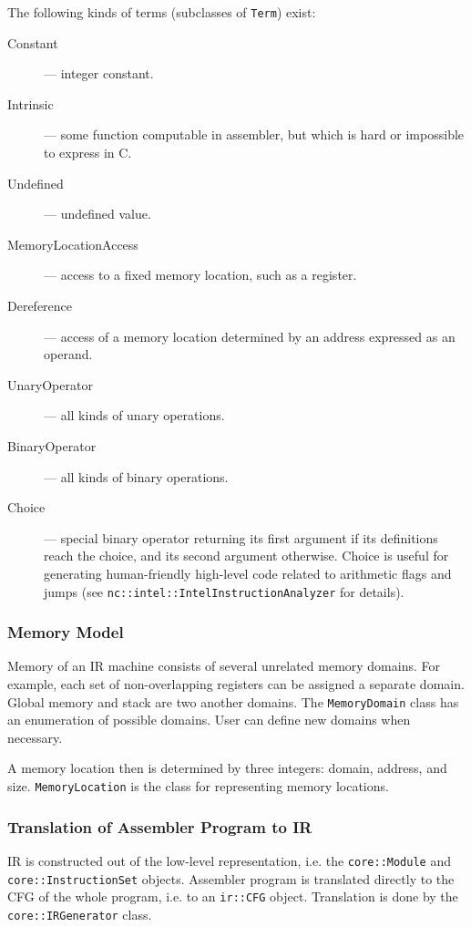 \documentclass[a4paper,12pt]{article}
\newcommand{\ident}[1]{\texttt{#1}}
\begin{document}
The following kinds of terms (subclasses of \ident{Term}) exist:
\begin{description}
\item[Constant] --- integer constant.
\item[Intrinsic] --- some function computable in assembler, but which is hard or impossible to express in C.
\item[Undefined] --- undefined value.
\item[MemoryLocationAccess] --- access to a fixed memory location, such as a register.
\item[Dereference] --- access of a memory location determined by an address expressed as an operand.
\item[UnaryOperator] --- all kinds of unary operations.
\item[BinaryOperator] --- all kinds of binary operations.
\item[Choice] --- special binary operator returning its first argument if its definitions reach the choice, and its second argument otherwise.
Choice is useful for generating human-friendly high-level code related to arithmetic flags and jumps (see \ident{nc::intel::IntelInstructionAnalyzer} for details).
\end{description}

\subsubsection{Memory Model}

Memory of an IR machine consists of several unrelated memory domains.
For example, each set of non-overlapping registers can be assigned a separate domain.
Global memory and stack are two another domains.
The \ident{MemoryDomain} class has an enumeration of possible domains.
User can define new domains when necessary.

A memory location then is determined by three integers: domain, address, and size.
\ident{MemoryLocation} is the class for representing memory locations.

\subsubsection{Translation of Assembler Program to IR}

IR is constructed out of the low-level representation, i.e. the \ident{core::Module} and \ident{core::InstructionSet} objects.
Assembler program is translated directly to the CFG of the whole program, i.e. to an \ident{ir::CFG} object.
Translation is done by the \ident{core::IRGenerator} class.
\end{document}
